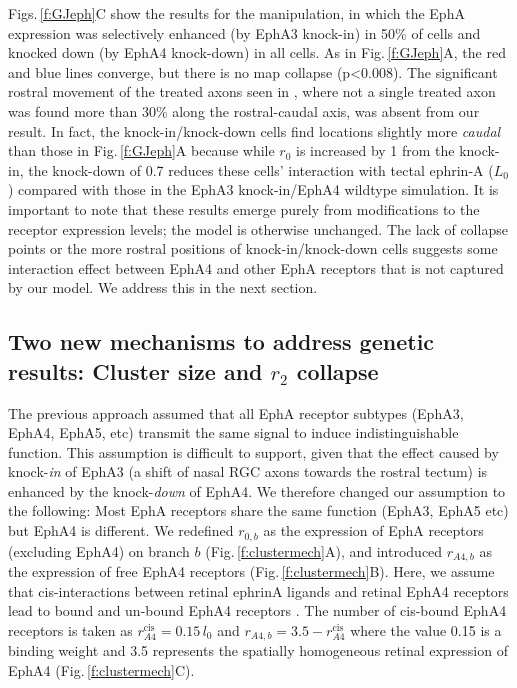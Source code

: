 \documentclass[11pt, a4paper]{article}
\begin{document}
Figs.\,\ref{f:GJeph}C show the results for the \citet{reber_relative_2004} manipulation, in which the EphA expression was selectively enhanced (by EphA3 knock-in) in 50\% of cells and knocked down (by EphA4 knock-down) in all cells.
As in Fig.\,\ref{f:GJeph}A, the red and blue lines converge, but there is no map collapse (p<0.008).
The significant rostral movement of the treated axons seen in \citet{reber_relative_2004}, where not a single treated axon was found more than 30\% along the rostral-caudal axis, was absent from our result.
In fact, the knock-in/knock-down cells find locations slightly more \emph{caudal} than those in Fig.\,\ref{f:GJeph}A because while $r_0$ is increased by 1 from the knock-in, the knock-down of 0.7 reduces these cells' interaction with tectal ephrin-A ($L_0$) compared with those in the EphA3 knock-in/EphA4 wildtype simulation.
It is important to note that these results emerge purely from modifications to the receptor expression levels; the model is otherwise unchanged.
The lack of collapse points or the more rostral positions of knock-in/knock-down cells suggests some interaction effect between EphA4 and other EphA receptors that is not captured by our model.
We address this in the next section.

\subsection*{Two new mechanisms to address genetic results: Cluster size and $r_2$ collapse}

The previous approach assumed that all EphA receptor subtypes (EphA3, EphA4, EphA5, etc) transmit the same signal to induce indistinguishable function.
This assumption is difficult to support, given that the effect caused by knock-\emph{in} of EphA3 (a shift of nasal RGC axons towards the rostral tectum) is enhanced by the knock-\emph{down} of EphA4.
We therefore changed our assumption to the following: Most EphA receptors share the same function (EphA3, EphA5 etc) but EphA4 is different.
We redefined $r_{0,b}$ as the expression of EphA receptors (excluding EphA4) on branch $b$ (Fig.\,\ref{f:clustermech}A), and introduced $r_{\!\scriptscriptstyle A4,b}$ as the expression of free EphA4 receptors (Fig.\,\ref{f:clustermech}B). Here, we assume that cis-interactions between retinal ephrinA ligands and retinal EphA4 receptors lead to bound and un-bound EphA4 receptors \citep{hornberger_modulation_1999}. The number of cis-bound EphA4 receptors is taken as $r_{A4}^{\mathrm{cis}} = 0.15\,l_0$ and $r_{\!\scriptscriptstyle A4, b} = 3.5 - r_{A4}^{\mathrm{cis}}$ where the value 0.15 is a binding weight and 3.5 represents the spatially homogeneous retinal   expression of EphA4 (Fig.\,\ref{f:clustermech}C).
\end{document}
